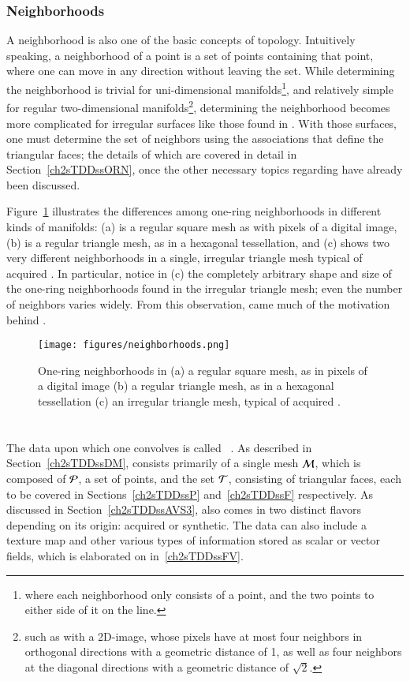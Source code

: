 %
%
\subsubsection{Neighborhoods}
\label{ch2sETBssTsssN}
A neighborhood is also one of the basic concepts of topology. Intuitively speaking, a neighborhood of a point is a set of points containing that point, where one can move in any direction without leaving the set. While determining the neighborhood is trivial for uni-dimensional manifolds\footnote{where each neighborhood only consists of a point, and the two points to either side of it on the line.}, and relatively simple for regular two-dimensional manifolds\footnote{such as with a 2D-image, whose pixels have at most four neighbors in orthogonal directions with a geometric distance of 1, as well as four neighbors at the diagonal directions with a geometric distance of $\sqrt{2}$.}, determining the neighborhood becomes more complicated for irregular surfaces like those found in \tdd{}. With those surfaces, one must determine the set of neighbors using the associations that define the triangular faces; the details of which are covered in detail in Section~\ref{ch2sTDDssORN}, once the other necessary topics regarding \tdd{} have already been discussed.

Figure~\ref{fig:neighborhoods} illustrates the differences among one-ring neighborhoods in different kinds of manifolds: (a) is a regular square mesh as with pixels of a digital image, (b) is a regular triangle mesh, as in a hexagonal tessellation, and (c) shows two very different neighborhoods in a single, irregular triangle mesh typical of acquired \tdd{}. In particular, notice in (c) the completely arbitrary shape and size of the one-ring neighborhoods found in the irregular triangle mesh; even the number of neighbors varies widely. From this observation, came much of the motivation behind .

\begin{figure}[ht]
\ffigbox
	{\texttt{[image: figures/neighborhoods.png]}}
	{\caption[One-Ring Neighborhoods in Regular and Irregular Meshes]{One-ring neighborhoods in (a) a regular square mesh, as in pixels of a digital image (b) a regular triangle mesh, as in a hexagonal tessellation (c) an irregular triangle mesh, typical of acquired \tdd{}.}\label{fig:neighborhoods}}
\end{figure}

%
%
%
%
%
%
\section{\tdd}
\label{ch2sTDD}
The data upon which one convolves  is called \tdd{}~\cite[p.~29]{Mara12}. As described in Section~\ref{ch2sTDDssDM}, \tdd{} consists primarily of a single mesh $\mathcal{M}$, which is composed of $\mathcal{P}$, a set of points, and the set $\mathcal{T}$, consisting of triangular faces, each to be covered in Sections~\ref{ch2sTDDssP} and~\ref{ch2sTDDssF} respectively. As discussed in Section~\ref{ch2sTDDssAVS3}, \tdd{} also comes in two distinct flavors depending on its origin: acquired or synthetic. The data can also include a texture map and other various types of information stored as scalar or vector fields, which is elaborated on in~\ref{ch2sTDDssFV}.

